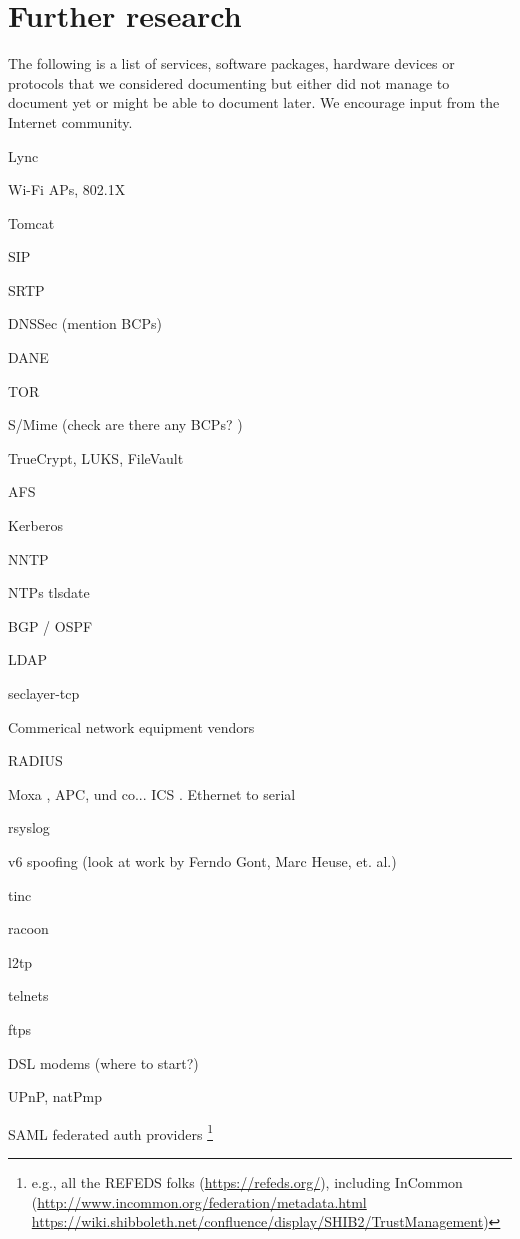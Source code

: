\chapter{Further research}
\label{cha:further-research}
The following is a list of services, software packages, hardware devices or protocols that we considered documenting but either did not manage to document yet or might be able to document later. We encourage input from the Internet community.

\begin{multicols}{3}
\begin{itemize*}
  \item Lync
  \item Wi-Fi APs, 802.1X
  \item Tomcat
  \item SIP
  \item SRTP
  \item DNSSec (mention BCPs)
  \item DANE
  \item TOR
  \item S/Mime (check are there any BCPs? )
  \item TrueCrypt, LUKS, FileVault
  \item AFS
  \item Kerberos
  \item NNTP
  \item NTPs tlsdate
  \item BGP / OSPF
  \item LDAP
  \item seclayer-tcp
  \item Commerical network equipment vendors
  \item RADIUS
  \item Moxa , APC, und co... ICS . Ethernet to serial
  \item rsyslog
  \item v6 spoofing (look at work by Ferndo Gont, Marc Heuse, et. al.)
  \item tinc
  \item racoon
  \item l2tp
  \item telnets
  \item ftps
  \item DSL modems (where to start?)
  \item UPnP, natPmp
  \item SAML federated auth providers \footnote{e.g., all the REFEDS folks (\url{https://refeds.org/}), including InCommon (\url{http://www.incommon.org/federation/metadata.html} \url{https://wiki.shibboleth.net/confluence/display/SHIB2/TrustManagement})}

\end{itemize*}
\end{multicols}
